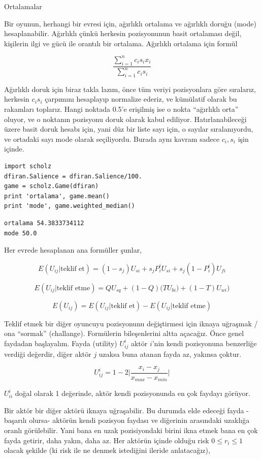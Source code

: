 \documentclass[12pt,fleqn]{article}\usepackage{../../common}
\begin{document}
Ortalamalar

Bir oyunun, herhangi bir evresi için, ağırlıklı ortalama ve ağırlıklı doruğu
(mode) hesaplanabilir. Ağırlıklı çünkü herkesin pozisyonunun basit ortalaması
değil, kişilerin ilgi ve gücü ile orantılı bir ortalama. Ağırlıklı ortalama için
formül

$$ \frac{\sum_{i=1}^{n} c_i s_i x_i}{\sum_{i=1}^{n} c_i s_i} $$

Ağırlıklı doruk için biraz takla lazım, önce tüm veriyi pozisyonlara göre
sıralarız, herkesin $c_is_i$ çarpımını hesaplayıp normalize ederiz, ve kümülatif
olarak bu rakamları toplarız. Hangi noktada 0.5'e erişilmiş ise o nokta
``ağırlıklı orta'' oluyor, ve o noktanın pozisyonu doruk olarak kabul
ediliyor. Hatırlanabileceği üzere basit doruk hesabı için, yani düz bir liste
sayı için, o sayılar sıralanıyordu, ve ortadaki sayı mode olarak
seçiliyordu. Burada aynı kavram sadece $c_i,s_i$ işin içinde.

\begin{verbatim}
import scholz
dfiran.Salience = dfiran.Salience/100.
game = scholz.Game(dfiran)
print 'ortalama', game.mean()
print 'mode', game.weighted_median()
\end{verbatim}

\begin{verbatim}
ortalama 54.3833734112
mode 50.0
\end{verbatim}

Her evrede hesaplanan ana formüller şunlar,

$$ E(U_{ij}|\textrm{teklif et}) = (1-s_j)U_{si} + s_jP_i^i U_{si} + s_j(1-P_i^i)U_{fi} $$

$$ E(U_{ij}|\textrm{teklif etme}) = QU_{sq} + (1-Q) \big( T U_{bi}) + (1-T)U_{wi} \big)$$

$$ E(U_{ij}) = E(U_{ij}|\textrm{teklif et}) - E(U_{ij}|\textrm{teklif etme}) $$

Teklif etmek bir diğer oyuncuyu pozisyonunu değiştirmesi için iknaya uğraşmak /
ona ``sormak'' (challange).  Formülerin bileşenlerini altta açacağız. Önce genel
faydadan başlayalım. Fayda (utility) $U_{ij}^i$ aktör $i$'nin kendi pozisyonuna
benzerliğe verdiği değerdir, diğer aktör $j$ uzaksa buna atanan fayda az,
yakınsa çoktur.

$$ U_{ij}^i = 1-2 \bigg| \frac{x_i - x_j}{x_{max}-x_{min}}\bigg|   $$

$U_{ii}^i$ doğal olarak 1 değerinde, aktör kendi pozisyonunda en çok
faydayı görüyor. 

Bir aktör bir diğer aktörü iknaya uğraşabilir. Bu durumda elde edeceği
fayda -başarılı olursa- aktörün kendi pozisyon faydası ve diğerinin
arasındaki uzaklığa oranlı görülebilir. Yani bana en uzak pozisiyondaki
birini ikna etmek bana en çok fayda getirir, daha yakın, daha az. Her
aktörün içinde olduğu risk $0 \le r_i \le 1$ olacak şekilde (ki risk ile
ne denmek istediğini ileride anlatacağız),
\end{document}
